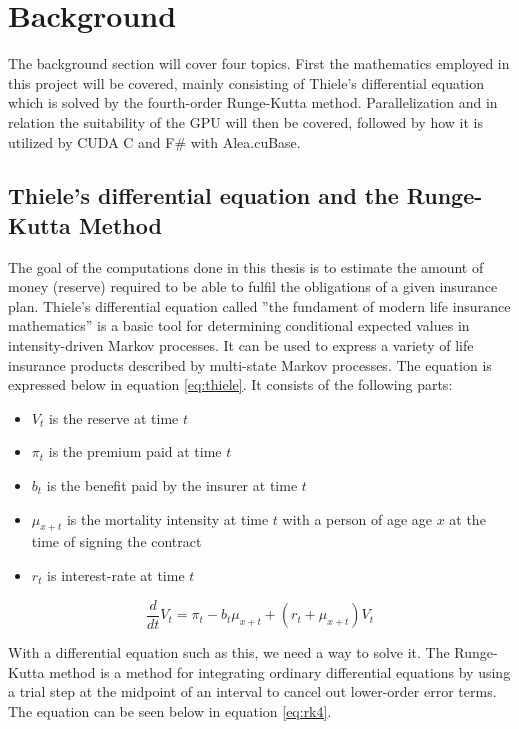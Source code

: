 \section{Background}
The background section will cover four topics. First the mathematics employed in this project will be covered,  mainly consisting of Thiele's differential equation which is solved by the fourth-order Runge-Kutta method.
Parallelization and in relation the suitability of the GPU will then be covered, followed by how it is utilized by CUDA C and F\# with Alea.cuBase.


\subsection{Thiele's differential equation and the Runge-Kutta Method}
The goal of the computations done in this thesis is to estimate the amount of money (reserve) required to be able to fulfil the obligations of a given insurance plan.
Thiele's differential equation\cite{thiele} called ''the fundament of modern life insurance mathematics''\cite{thiele:quote} is a basic tool for determining conditional expected values in intensity-driven Markov processes. It can be used to express a variety of life insurance products described by multi-state Markov processes.
The equation is expressed below in equation \ref{eq:thiele}. It consists of the following parts:

\begin{itemize}
\item $V_t$ is the reserve at time $t$
\item $\pi_t$ is the premium paid at time $t$
\item $b_t$ is the benefit paid by the insurer at time $t$
\item $\mu_{x+t}$ is the mortality intensity at time $t$ with a person of age age $x$ at the time of signing the contract
\item $r_t$ is interest-rate at time $t$
\end{itemize}

\begin{equation}\label{eq:thiele}
\frac{d}{dt}V_t = \pi_t - b_t \mu_{x+t} + (r_t + \mu_{x+t}) V_t
\end{equation}

With a differential equation such as this, we need a way to solve it. 
The Runge-Kutta method\cite{runge-kutta} is a method for integrating ordinary differential equations by using a trial step at the midpoint of an interval to cancel out lower-order error terms.
The equation can be seen below in equation \ref{eq:rk4}.

